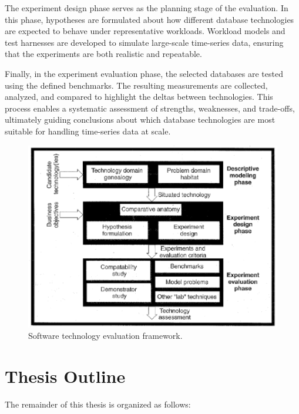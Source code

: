 The experiment design phase serves as the planning stage of the evaluation.
In this phase, hypotheses are formulated about how different database
technologies are expected to behave under representative workloads. Workload
models and test harnesses are developed to simulate large-scale time-series
data, ensuring that the experiments are both realistic and repeatable.

Finally, in the experiment evaluation phase, the selected databases are tested
using the defined benchmarks. The resulting measurements are
collected, analyzed, and compared to highlight the deltas between technologies.
This process enables a systematic assessment of strengths, weaknesses, and
trade-offs, ultimately guiding conclusions about which database technologies
are most suitable for handling time-series data at scale.

\begin{figure}
      \centering
      \includegraphics[scale=0.8]{figs/framework.png}
      \caption{Software technology evaluation framework.}
      \label{fig:framework}
\end{figure}

\newpage
\section{Thesis Outline}
The remainder of this thesis is organized as follows:

